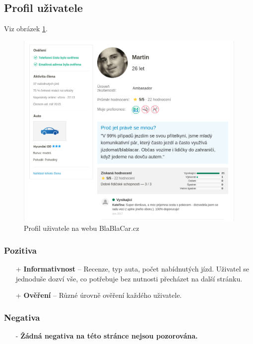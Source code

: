 
\newpage
\subsection{Profil uživatele}
Viz obrázek \ref{fig:blablacar:profile}.
\begin{figure}[h]
    \centering
    \includegraphics[width=1.0\textwidth]{media/blablacar/profile.png}
    \caption{Profil uživatele na webu BlaBlaCar.cz}
    \label{fig:blablacar:profile}
\end{figure}
\subsubsection*{Pozitiva}
\begin{itemize}
    \item[+] \textbf{Informativnost} -- Recenze, typ auta, počet nabídnutých jízd. Uživatel se jednoduše dozví vše, co potřebuje bez nutnosti přecházet na další stránku.
    \item[+] \textbf{Ověření} -- Různé úrovně ověření každého uživatele.
\end{itemize}
\subsubsection*{Negativa}
\begin{itemize}
    \item[-] \textbf{Žádná negativa na této stránce nejsou pozorována.}
\end{itemize}


